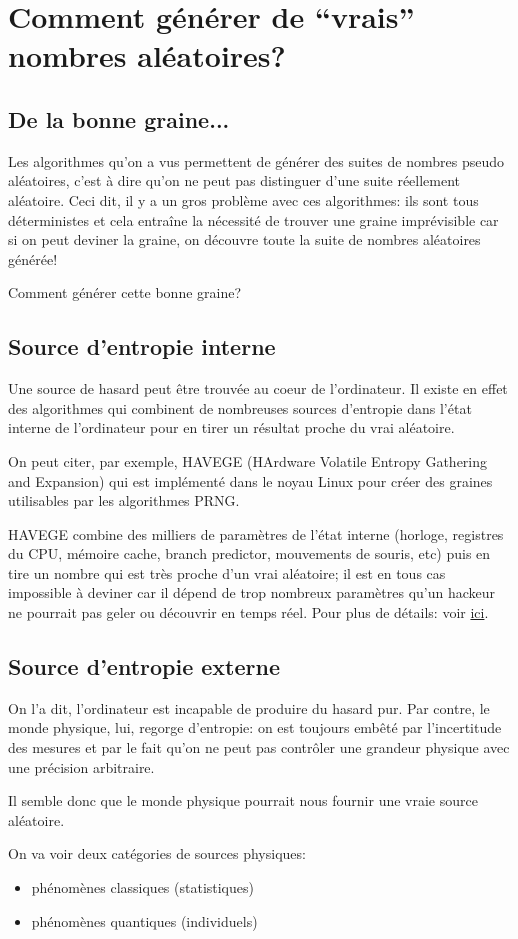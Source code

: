 \documentclass{scrartcl}
\begin{document}
\section{Comment générer de ``vrais'' nombres aléatoires?}\label{s:TRNG}
\subsection{De la bonne graine...}
Les algorithmes qu'on a vus permettent de générer des suites de nombres pseudo aléatoires, c'est à dire qu'on ne peut pas distinguer d'une suite réellement aléatoire. Ceci dit, il y a un gros problème avec ces algorithmes: ils sont tous déterministes et cela entraîne la nécessité de trouver une graine imprévisible car si on peut deviner la graine, on découvre toute la suite de nombres aléatoires générée!\par
Comment générer cette bonne graine?

\subsection{Source d'entropie interne}\label{ss:havege}
Une source de hasard peut être trouvée au coeur de l'ordinateur. Il existe en
effet des algorithmes qui combinent de nombreuses sources d'entropie dans l’état
interne de l’ordinateur pour en tirer un résultat proche du vrai aléatoire. \par
On peut citer, par exemple, HAVEGE (HArdware Volatile Entropy Gathering and
Expansion) qui est implémenté dans le noyau Linux pour créer des graines
utilisables par les algorithmes PRNG.\par
HAVEGE combine des milliers de paramètres de l’état interne (horloge, registres
du CPU, mémoire cache, branch predictor, mouvements de souris, etc) puis en tire
un nombre qui est très proche d'un vrai aléatoire; il est en tous cas impossible
à deviner car il dépend de trop nombreux paramètres qu’un hackeur ne pourrait
pas geler ou découvrir en temps réel.  Pour plus de détails: voir
\href{https://www.irisa.fr/caps/projects/hipsor/misc.php}{ici}.

\subsection{Source d'entropie externe}
On l'a dit, l'ordinateur est incapable de produire du hasard pur. Par contre, le monde physique, lui, regorge d'entropie: on est toujours embêté par l’incertitude des mesures et par le fait qu’on ne peut pas contrôler une grandeur physique avec une précision arbitraire. \par
Il semble donc que le monde physique pourrait nous fournir une vraie source aléatoire. \par
On va voir deux catégories de sources physiques:
\begin{itemize}
\item phénomènes classiques (statistiques)
\item phénomènes quantiques (individuels)
\end{itemize}
\end{document}
